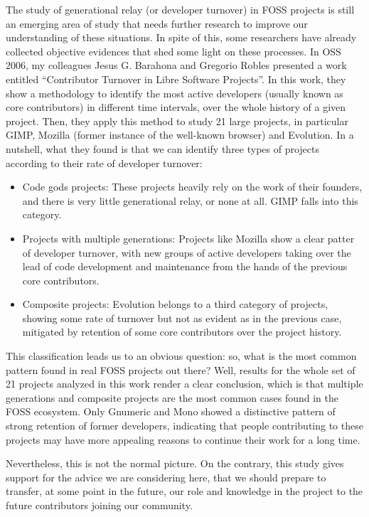 The study of generational relay (or developer turnover) in FOSS projects is
still an emerging area of study that needs further research to improve our
understanding of these situations. In spite of this, some researchers have
already collected objective evidences that shed some light on these processes.
In OSS 2006, my colleagues Jesus G. Barahona and Gregorio Robles presented a
work entitled ``Contributor Turnover in Libre Software Projects''. In this work,
they show a methodology to identify the most active developers (usually known as
core contributors) in different time intervals, over the whole history of a
given  project. Then, they apply this method to study 21 large projects, in
particular GIMP, Mozilla (former instance of the well-known browser) and
Evolution. In a nutshell, what they found is that we can identify three types of
projects according to their rate of developer turnover:
\begin{itemize}
 \item Code gods projects: These projects heavily rely on the work of their
founders, and there is very little generational relay, or none at all. GIMP
falls into this category.
 \item Projects with multiple generations: Projects like Mozilla show a clear
patter of developer turnover, with new groups of active developers taking over
the lead of code development and maintenance from the hands of the previous core
contributors.
 \item Composite projects: Evolution belongs to a third category of projects,
showing some rate of turnover but not as evident as in the previous case,
mitigated by retention of some core contributors over the project history.
\end{itemize}

This classification leads us to an obvious question: so, what is the most common
pattern found in real FOSS projects out there? Well, results for the whole set
of 21 projects analyzed in this work render a clear conclusion, which is that
multiple generations and composite projects are the most common cases found in
the FOSS ecosystem. Only Gnumeric and Mono showed a distinctive pattern of strong retention of former developers, indicating that people contributing to these projects may have more appealing reasons to continue their work for a long time.

Nevertheless, this is not the normal picture. On the contrary, this study gives
support for the advice we are considering here, that we should prepare to
transfer, at some point in the future, our role and knowledge in the project to
the future contributors joining our community.

